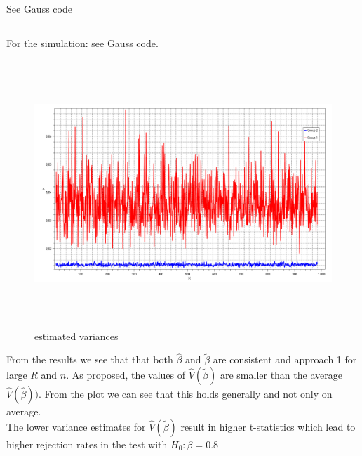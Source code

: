 \documentclass[11pt]{article}
\theoremstyle{break}
\begin{document}
\subsection{}
See Gauss code

\subsection{}
For the simulation: see Gauss code. \\
\begin{figure}[H]
\centering
\includegraphics[height=100mm]{variance_estimators.pdf}
\caption{estimated variances}
\end{figure}
From the results we see that that both $\hat{\beta}$ and $\tilde{\beta}$ are consistent and approach 1 for large $R$ and $n$. As proposed, the values of $\hat{V}(\tilde{\beta})$ are smaller than the average $\hat{V}(\hat{\beta}))$. From the plot we can see that this holds generally and not only on average. \\
The lower variance estimates for $\hat{V}(\tilde{\beta})$ result in higher t-statistics which lead to higher rejection rates in the test with $H_0:\beta=0.8$
\end{document}

